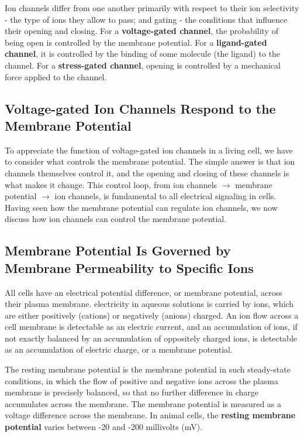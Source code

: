 Ion channels differ from one another primarily with respect to their ion selectivity - the type of ions they allow to pass; and
gating - the conditions that influence their opening and closing. For a
\textbf{voltage-gated channel}, the probability of being open is controlled by
the membrane potential. For a \textbf{ligand-gated channel}, it
is controlled by the binding of some molecule (the ligand) to the channel.
For a \textbf{stress-gated channel}, opening is controlled
by a mechanical force applied to the channel.

\subsection{Voltage-gated Ion Channels Respond to the Membrane Potential}

To appreciate the function of voltage-gated ion channels in a living cell,
we have to consider what controls the membrane potential. The simple
answer is that ion channels themselves control it, and the opening and
closing of these channels is what makes it change. This control loop, from
ion channels $\rightarrow$ membrane potential $\rightarrow$ ion channels, is fundamental to
all electrical signaling in cells. Having seen how the membrane potential
can regulate ion channels, we now discuss how ion channels can control
the membrane potential.

\subsection{Membrane Potential Is Governed by Membrane Permeability to Specific Ions}

All cells have an electrical potential difference, or membrane potential,
across their plasma membrane. electricity in aqueous solutions is carried
by ions, which are either positively (cations) or negatively (anions)
charged. An ion flow across a cell membrane is detectable as an electric
current, and an accumulation of ions, if not exactly balanced by an accumulation
of oppositely charged ions, is detectable as an accumulation of
electric charge, or a membrane potential.

The resting membrane potential is the membrane potential in such steady-state
conditions, in which the flow of positive and negative ions across
the plasma membrane is precisely balanced, so that no further difference
in charge accumulates across the membrane. The membrane potential is
measured as a voltage difference across the membrane. In animal cells,
the \textbf{resting membrane potential} varies between -20 and -200 millivolts
(mV).


